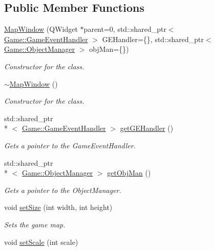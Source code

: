 \subsection*{Public Member Functions}
\begin{DoxyCompactItemize}
\item 
\hyperlink{classMapWindow_a3ec35b9ff3b37501acef051124b69b45}{Map\-Window} (Q\-Widget $\ast$parent=0, std\-::shared\-\_\-ptr$<$ \hyperlink{classGame_1_1GameEventHandler}{Game\-::\-Game\-Event\-Handler} $>$ G\-E\-Handler=\{\}, std\-::shared\-\_\-ptr$<$ \hyperlink{classGame_1_1ObjectManager}{Game\-::\-Object\-Manager} $>$ obj\-Man=\{\})
\begin{DoxyCompactList}\small\item\em Constructor for the class. \end{DoxyCompactList}\item 
\hyperlink{classMapWindow_a12edf2fb9ac7a6ebf501c0da8aa327dc}{$\sim$\-Map\-Window} ()
\begin{DoxyCompactList}\small\item\em Constructor for the class. \end{DoxyCompactList}\item 
std\-::shared\-\_\-ptr\\*
$<$ \hyperlink{classGame_1_1GameEventHandler}{Game\-::\-Game\-Event\-Handler} $>$ \hyperlink{classMapWindow_a4f33832987faa5e0283aa1da594c3d5d}{get\-G\-E\-Handler} ()
\begin{DoxyCompactList}\small\item\em Gets a pointer to the Game\-Event\-Handler. \end{DoxyCompactList}\item 
std\-::shared\-\_\-ptr\\*
$<$ \hyperlink{classGame_1_1ObjectManager}{Game\-::\-Object\-Manager} $>$ \hyperlink{classMapWindow_adaedf919273d3065b323d0122c905cff}{get\-Obj\-Man} ()
\begin{DoxyCompactList}\small\item\em Gets a pointer to the Object\-Manager. \end{DoxyCompactList}\item 
void \hyperlink{classMapWindow_a7b5fcf2d1ba7c211faabdfd3c81cc5b5}{set\-Size} (int width, int height)
\begin{DoxyCompactList}\small\item\em Sets the game map. \end{DoxyCompactList}\item 
void \hyperlink{classMapWindow_a9d5c988b6ac8dced6aa128df160be6cc}{set\-Scale} (int scale)

\end{DoxyCompactItemize}
